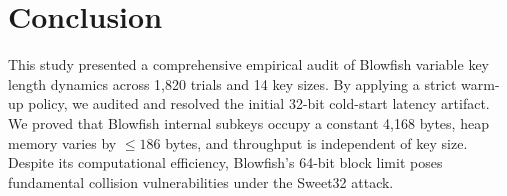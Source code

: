 \documentclass[conference]{IEEEtran}
\begin{document}
\section{Conclusion}
This study presented a comprehensive empirical audit of Blowfish variable key length dynamics across 1,820 trials and 14 key sizes. By applying a strict warm-up policy, we audited and resolved the initial 32-bit cold-start latency artifact. We proved that Blowfish internal subkeys occupy a constant 4,168 bytes, heap memory varies by $\le 186$ bytes, and throughput is independent of key size. Despite its computational efficiency, Blowfish's 64-bit block limit poses fundamental collision vulnerabilities under the Sweet32 attack.



\end{document}
